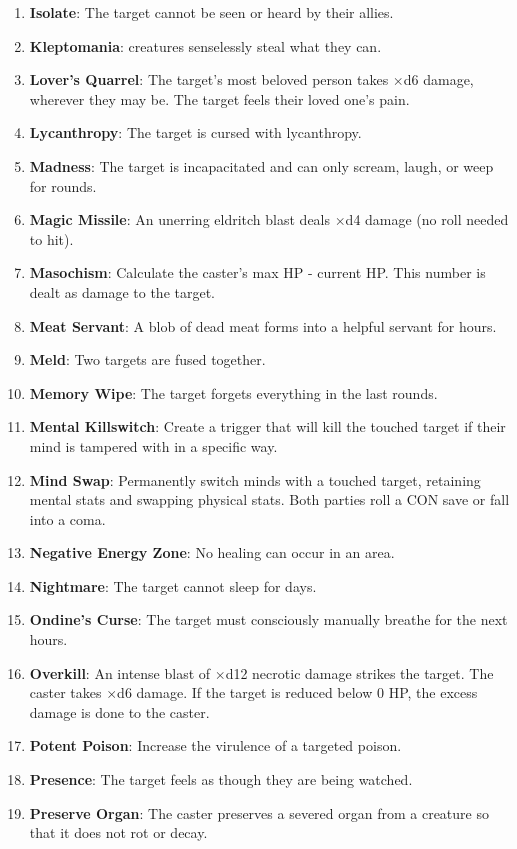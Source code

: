 \documentclass[twoside]{article}
\newcommand{\lle}{\raisebox{\depth}{\rotatebox{180}{$\ell$}}}
\begin{document}
\begin{enumerate}[nosep]
\item \textbf{Isolate}: The target cannot be seen or heard by their allies. 
\item \textbf{Kleptomania}: \lle{} creatures senselessly steal what they can.
\item \textbf{Lover's Quarrel}: The target's most beloved person takes \lle$\times$d6 damage, wherever they may be. The target feels their loved one's pain.
\item \textbf{Lycanthropy}: The target is cursed with lycanthropy.
\item \textbf{Madness}: The target is incapacitated and can only scream, laugh, or weep for \lle{} rounds.
\item \textbf{Magic Missile}: An unerring eldritch blast deals \lle$\times$d4 damage (no roll needed to hit).
\item \textbf{Masochism}: Calculate the caster's max HP - current HP. This number is dealt as damage to the target.
\item \textbf{Meat Servant}: A blob of dead meat forms into a helpful servant for \lle{} hours.
\item \textbf{Meld}: Two targets are fused together.
\item \textbf{Memory Wipe}: The target forgets everything in the last \lle{} rounds.
\item \textbf{Mental Killswitch}: Create a trigger that will kill the touched target if their mind is tampered with in a specific way.
\item \textbf{Mind Swap}: Permanently switch minds with a touched target, retaining mental stats and swapping physical stats. Both parties roll a CON save or fall into a coma.
\item \textbf{Negative Energy Zone}: No healing can occur in an area.
\item \textbf{Nightmare}: The target cannot sleep for \lle{} days.
\item \textbf{Ondine's Curse}: The target must consciously manually breathe for the next \lle{} hours.
\item \textbf{Overkill}: An intense blast of \lle$\times$d12 necrotic damage strikes the target. The caster takes \lle$\times$d6 damage. If the target is reduced below 0 HP, the excess damage is done to the caster.
\item \textbf{Potent Poison}: Increase the virulence of a targeted poison.
\item \textbf{Presence}: The target feels as though they are being watched.
\item \textbf{Preserve Organ}: The caster preserves a severed organ from a creature so that it does not rot or decay.

\end{enumerate}
\end{document}
